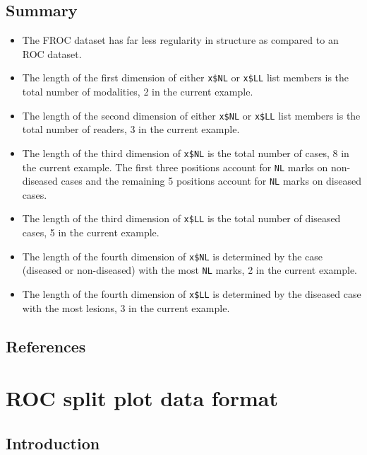 \documentclass[]{book}
\providecommand{\tightlist}{%
  \setlength{\itemsep}{0pt}\setlength{\parskip}{0pt}}
\begin{document}
\hypertarget{summary}{%
\section{Summary}\label{summary}}

\begin{itemize}
\tightlist
\item
  The FROC dataset has far less regularity in structure as compared to an ROC dataset.
\item
  The length of the first dimension of either \texttt{x\$NL} or \texttt{x\$LL} list members is the total number of modalities, 2 in the current example.
\item
  The length of the second dimension of either \texttt{x\$NL} or \texttt{x\$LL} list members is the total number of readers, 3 in the current example.
\item
  The length of the third dimension of \texttt{x\$NL} is the total number of cases, 8 in the current example. The first three positions account for \texttt{NL} marks on non-diseased cases and the remaining 5 positions account for \texttt{NL} marks on diseased cases.
\item
  The length of the third dimension of \texttt{x\$LL} is the total number of diseased cases, 5 in the current example.
\item
  The length of the fourth dimension of \texttt{x\$NL} is determined by the case (diseased or non-diseased) with the most \texttt{NL} marks, 2 in the current example.
\item
  The length of the fourth dimension of \texttt{x\$LL} is determined by the diseased case with the most lesions, 3 in the current example.
\end{itemize}

\hypertarget{references-2}{%
\section{References}\label{references-2}}

\hypertarget{rocSpdataformat}{%
\chapter{ROC split plot data format}\label{rocSpdataformat}}

\hypertarget{introduction-2}{%
\section{Introduction}\label{introduction-2}}
\end{document}
